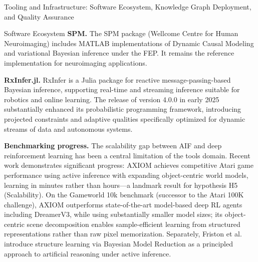 \documentclass[
  ignorenonframetext,
]{beamer}
\begin{document}
\begin{frame}[fragile]{Tooling and Infrastructure: Software Ecosystem,
Knowledge Graph Deployment, and Quality Assurance \label{sec:tooling}}
\begin{block}{Software Ecosystem}
\textbf{SPM.} The SPM package (Wellcome Centre for Human Neuroimaging)
includes MATLAB implementations of Dynamic Causal Modeling and
variational Bayesian inference under the FEP. It remains the reference
implementation for neuroimaging applications.

\textbf{RxInfer.jl.} RxInfer is a Julia package for reactive
message-passing-based Bayesian inference, supporting real-time and
streaming inference suitable for robotics and online learning. The
release of version 4.0.0 in early 2025 \citep{rxinfer2025} substantially
enhanced its probabilistic programming framework, introducing projected
constraints and adaptive qualities specifically optimized for dynamic
streams of data and autonomous systems.

\textbf{Benchmarking progress.} The scalability gap between AIF and deep
reinforcement learning has been a central limitation of the tools
domain. Recent work demonstrates significant progress: AXIOM
\citep{heins2025axiom} achieves competitive Atari game performance using
active inference with expanding object-centric world models, learning in
minutes rather than hours---a landmark result for hypothesis H5
(Scalability). On the Gameworld 10k benchmark (successor to the Atari
100K challenge), AXIOM outperforms state-of-the-art model-based deep RL
agents including DreamerV3, while using substantially smaller model
sizes; its object-centric scene decomposition enables sample-efficient
learning from structured representations rather than raw pixel
memorization. Separately, Friston et al.~\citep{friston2025active}
introduce structure learning via Bayesian Model Reduction as a
principled approach to artificial reasoning under active inference.


\end{block}
\end{frame}
\end{document}
